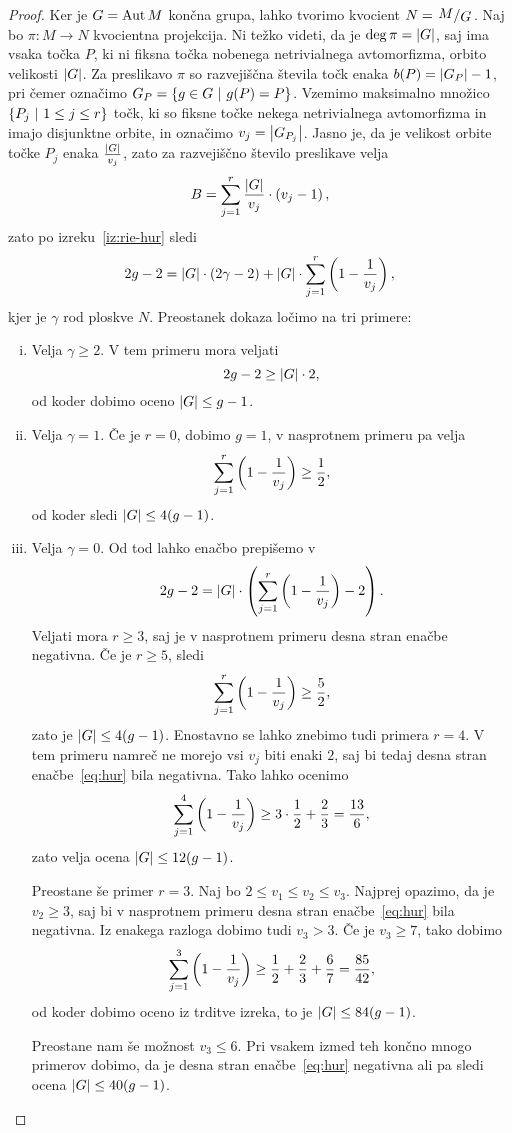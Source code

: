 \begin{proof}
Ker je $G = \operatorname{Aut} M$ končna grupa, lahko tvorimo kvocient
$N = \kvoc{M}{G}$. Naj bo $\pi \colon M \to N$ kvocientna
projekcija. Ni težko videti, da je $\deg \pi = \left\lvert G\right\rvert$, saj ima
vsaka točka $P$, ki ni fiksna točka nobenega netrivialnega
avtomorfizma, orbito velikosti $\left\lvert G\right\rvert$. Za preslikavo $\pi$ so
razvejiščna števila točk enaka $b(P) = \left\lvert G_P\right\rvert - 1$, pri čemer
označimo $G_P = \left\{g \in G~\middle\vert~g(P) = P\right\}$. Vzemimo maksimalno
množico $\left\{P_j~\middle\vert~1 \leq j \leq r\right\}$ točk, ki so fiksne točke
nekega netrivialnega avtomorfizma in imajo disjunktne orbite, in
označimo $v_j = \left\lvert G_{P_j}\right\rvert$. Jasno je, da je velikost orbite
točke $P_j$ enaka $\frac{\left\lvert G\right\rvert}{v_j}$, zato za razvejiščno
število preslikave velja
\[
B = \sum_{j=1}^r \frac{\left\lvert G\right\rvert}{v_j} \cdot \left(v_j - 1\right),
\]
zato po izreku~\ref{iz:rie-hur} sledi
\[
2g - 2 = \left\lvert G\right\rvert \cdot (2 \gamma - 2) +
\left\lvert G\right\rvert \cdot \sum_{j=1}^r \left(1 - \frac{1}{v_j}\right),
\]
kjer je $\gamma$ rod ploskve $N$. Preostanek dokaza ločimo na tri
primere:

\begin{enumerate}[i)]
\item Velja $\gamma \geq 2$. V tem primeru mora veljati
\[
2g - 2 \geq \left\lvert G\right\rvert \cdot 2,
\]
od koder dobimo oceno $\left\lvert G\right\rvert \leq g-1$.

\item Velja $\gamma = 1$. Če je $r=0$, dobimo $g=1$, v nasprotnem
primeru pa velja
\[
\sum_{j=1}^r \left(1 - \frac{1}{v_j}\right) \geq \frac{1}{2},
\]
od koder sledi $\left\lvert G\right\rvert \leq 4(g-1)$.

\item Velja $\gamma = 0$. Od tod lahko enačbo prepišemo v
\begin{equation}\label{eq:hur}
2g - 2 =
\left\lvert G\right\rvert \cdot \left(\sum_{j=1}^r \left(1 - \frac{1}{v_j}\right) - 2\right).
\end{equation}
Veljati mora $r \geq 3$, saj je v nasprotnem primeru desna stran
enačbe negativna. Če je $r \geq 5$, sledi
\[
\sum_{j=1}^r \left(1 - \frac{1}{v_j}\right) \geq \frac{5}{2},
\]
zato je $\left\lvert G\right\rvert \leq 4(g-1)$. Enostavno se lahko znebimo tudi
primera $r=4$. V tem primeru namreč ne morejo vsi $v_j$ biti enaki
$2$, saj bi tedaj desna stran enačbe~\eqref{eq:hur} bila negativna.
Tako lahko ocenimo
\[
\sum_{j=1}^4 \left(1 - \frac{1}{v_j}\right) \geq
3 \cdot \frac{1}{2} + \frac{2}{3} =
\frac{13}{6},
\]
zato velja ocena $\left\lvert G\right\rvert \leq 12(g-1)$.

Preostane še primer $r=3$. Naj bo $2 \leq v_1 \leq v_2 \leq v_3$.
Najprej opazimo, da je $v_2 \geq 3$, saj bi v nasprotnem primeru
desna stran enačbe~\eqref{eq:hur} bila negativna. Iz enakega
razloga dobimo tudi $v_3 > 3$. Če je $v_3 \geq 7$, tako dobimo
\[
\sum_{j=1}^3 \left(1 - \frac{1}{v_j}\right) \geq
\frac{1}{2} + \frac{2}{3} + \frac{6}{7} = \frac{85}{42},
\]
od koder dobimo oceno iz trditve izreka, to je
$\left\lvert G\right\rvert \leq 84(g-1)$.

Preostane nam še možnost $v_3 \leq 6$. Pri vsakem izmed teh končno
mnogo primerov dobimo, da je desna stran enačbe~\eqref{eq:hur}
negativna ali pa sledi ocena $\left\lvert G\right\rvert \leq 40(g-1)$. \qedhere
\end{enumerate}
\end{proof}
